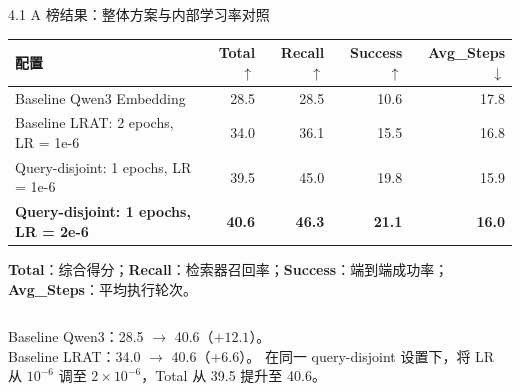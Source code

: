 \begin{frame}{4.1 A 榜结果：整体方案与内部学习率对照}
    \centering
    {\scriptsize
    \begin{tabular}{@{}p{6.00cm}rrrr@{}}
        \toprule
        配置 & Total $\uparrow$ & Recall $\uparrow$ & Success $\uparrow$ & Avg\_Steps $\downarrow$ \\
        \midrule
        Baseline Qwen3 Embedding & 28.5 & 28.5 & 10.6 & 17.8 \\
        Baseline LRAT: 2 epochs, LR = 1e-6 & 34.0 & 36.1 & 15.5 & 16.8 \\
        Query-disjoint: 1 epochs, LR = 1e-6 & 39.5 & 45.0 & 19.8 & 15.9 \\
        \rowcolor{softBlue}\textbf{Query-disjoint: 1 epochs, LR = 2e-6} & \textbf{40.6} & \textbf{46.3} & \textbf{21.1} & \textbf{16.0} \\
        \bottomrule
    \end{tabular}
    }

    \footnotesize\textcolor{mutedGray}{\textbf{Total}：综合得分；\textbf{Recall}：检索器召回率；\textbf{Success}：端到端成功率；\textbf{Avg\_Steps}：平均执行轮次。}\\

    \vspace{1mm}
    \begin{columns}[T,onlytextwidth]
        \small
        Baseline Qwen3：28.5 $\rightarrow$ 40.6（$+12.1$）。\\
        Baseline LRAT：34.0 $\rightarrow$ 40.6（$+6.6$）。
        \small 在同一 query-disjoint 设置下，将 LR 从 $10^{-6}$ 调至 $2\times10^{-6}$，Total 从 39.5 提升至 40.6。
    \end{columns}
\end{frame}
